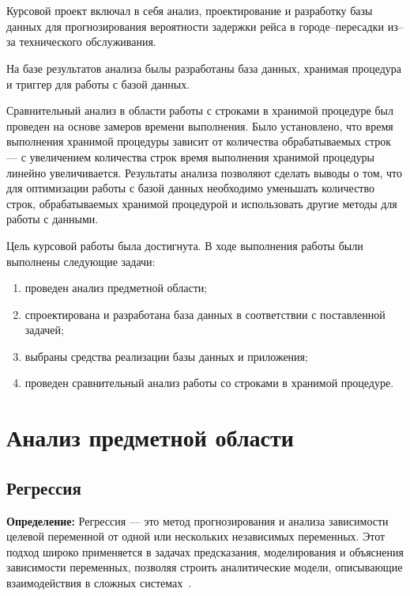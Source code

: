 \chapter*{}

Курсовой проект включал в себя анализ, проектирование и разработку
базы данных для прогнозирования вероятности задержки рейса в городе--пересадки из--за технического обслуживания.

На базе результатов анализа былы разработаны база данных, хранимая процедура и триггер для работы с базой данных.

Сравнительный анализ в области работы с строками в хранимой процедуре был проведен на основе замеров времени выполнения.
Было установлено, что время выполнения хранимой процедуры зависит от количества обрабатываемых строк --- с увеличением количества строк время выполнения хранимой процедуры линейно увеличивается.
Результаты анализа позволяют сделать выводы о том, что для оптимизации работы с базой данных необходимо уменьшать количество строк, обрабатываемых хранимой процедурой
и использовать другие методы для работы с данными.

Цель курсовой работы была достигнута.
В ходе выполнения работы были выполнены следующие задачи:
\begin{enumerate}[label=\arabic*)]
    \item проведен анализ предметной области;
    \item спроектирована и разработана база данных в соответствии с поставленной задачей;
    \item выбраны средства реализации базы данных и приложения;
    \item проведен сравнительный анализ работы со строками в хранимой процедуре.
\end{enumerate}


\chapter{Анализ предметной области}

\section{Регрессия}

\textbf{Определение:} Регрессия — это метод прогнозирования и анализа зависимости целевой переменной от одной или нескольких независимых переменных.
Этот подход широко применяется в задачах предсказания, моделирования и объяснения зависимости переменных, позволяя строить аналитические модели, описывающие взаимодействия в сложных системах~\cite{seber, montgomery}.

